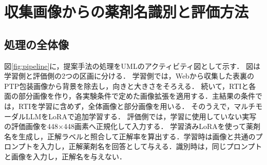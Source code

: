 \documentclass[uplatex,dvipdfmx]{jsarticle}
\begin{document}
\clearpage
\section{収集画像からの薬剤名識別と評価方法}\label{sec:method}

\subsection{処理の全体像}

図\ref{fig:pipeline}に，提案手法の処理をUMLのアクティビティ図として示す．
図は学習側と評価側の2つの区画に分ける．
学習側では，Webから収集した表裏のPTP包装画像から背景を除去し，向きと大きさをそろえる．
続いて，RTIと各面の部分画像を作り，各実験条件で定めた画像拡張を適用する．主結果の条件では，RTIを学習に含めず，全体画像と部分画像を用いる．
そのうえで，マルチモーダルLLMをLoRAで追加学習する．
評価側では，学習に使用していない実写の評価画像を448$\times$448画素へ正規化して入力する．
学習済みLoRAを使って薬剤名を生成し，正解ラベルと照合して正解率を算出する．学習時は画像と共通のプロンプトを入力し，正解薬剤名を回答として与える．識別時は，同じプロンプトと画像を入力し，正解名を与えない．
\end{document}
